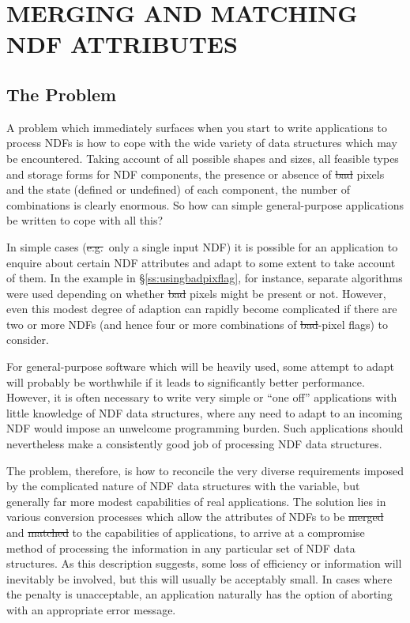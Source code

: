 \section{MERGING AND MATCHING NDF ATTRIBUTES}

\subsection{The Problem}

A problem which immediately surfaces when you start to write applications to
process NDFs is how to cope with the wide variety of data structures which
may be encountered.
Taking account of all possible shapes and sizes, all feasible types and storage
forms for NDF components, the presence or absence of \st{bad\/} pixels and the
state (defined or undefined) of each component, the number of combinations is
clearly enormous.
So how can simple general-purpose applications be written to cope with all 
this?

In simple cases (\st{e.g.}\ only a single input NDF) it is possible for an
application to enquire about certain NDF attributes and adapt to some extent
to take account of them. 
In the example in \S\ref{ss:usingbadpixflag}, for instance, separate
algorithms were used depending on whether \st{bad\/} pixels might be present
or not. 
However, even this modest degree of adaption can rapidly become complicated
if there are two or more NDFs (and hence four or more combinations of
\st{bad\/}-pixel flags) to consider.  

For general-purpose software which will be heavily used, some attempt to 
adapt will probably be worthwhile if it leads to significantly better
performance. 
However, it is often necessary to write very simple or ``one off''
applications with little knowledge of NDF data structures, where any need to
adapt to an incoming NDF would impose an unwelcome programming burden. 
Such applications should nevertheless make a consistently good job of
processing NDF data structures. 

The problem, therefore, is how to reconcile the very diverse requirements
imposed by the complicated nature of NDF data structures with the variable,
but generally far more modest capabilities of real applications. 
The solution lies in various conversion processes which allow the attributes
of NDFs to be \st{merged\/} and \st{matched\/} to the capabilities of
applications, to arrive at a compromise method of processing the information
in any particular set of NDF data structures. 
As this description suggests, some loss of efficiency or information will
inevitably be involved, but this will usually be acceptably small.
In cases where the penalty is unacceptable, an application naturally has the
option of aborting with an appropriate error message. 

